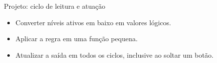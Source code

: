\begin{frame}[fragile,t]{Projeto: ciclo de leitura e atuação}

\begin{itemize}
\item Converter níveis ativos em baixo em valores lógicos.
\item Aplicar a regra em uma função pequena.
\item Atualizar a saída em todos os ciclos, inclusive ao soltar um botão.
\end{itemize}
\end{frame}

